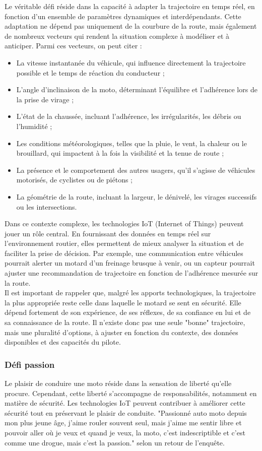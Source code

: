 Le véritable défi réside dans la capacité à adapter la trajectoire en temps réel, en fonction d’un ensemble de paramètres dynamiques et interdépendants. Cette adaptation ne dépend pas uniquement de la courbure de la route, mais également de nombreux vecteurs qui rendent la situation complexe à modéliser et à anticiper. Parmi ces vecteurs, on peut citer :\\
\begin{itemize}
\item La vitesse instantanée du véhicule, qui influence directement la trajectoire possible et le temps de réaction du conducteur ;
\item L’angle d’inclinaison de la moto, déterminant l’équilibre et l’adhérence lors de la prise de virage ;
\item L’état de la chaussée, incluant l’adhérence, les irrégularités, les débris ou l’humidité ;
\item Les conditions météorologiques, telles que la pluie, le vent, la chaleur ou le brouillard, qui impactent à la fois la visibilité et la tenue de route ;
\item La présence et le comportement des autres usagers, qu’il s’agisse de véhicules motorisés, de cyclistes ou de piétons ;
\item La géométrie de la route, incluant la largeur, le dénivelé, les virages successifs ou les intersections.
\end{itemize}
Dans ce contexte complexe, les technologies IoT (Internet of Things) peuvent jouer un rôle central. En fournissant des données en temps réel sur l’environnement routier, elles permettent de mieux analyser la situation et de faciliter la prise de décision. Par exemple, une communication entre véhicules pourrait alerter un motard d’un freinage brusque à venir, ou un capteur pourrait ajuster une recommandation de trajectoire en fonction de l’adhérence mesurée sur la route.\\
Il est important de rappeler que, malgré les apports technologiques, la trajectoire la plus appropriée reste celle dans laquelle le motard se sent en sécurité. Elle dépend fortement de son expérience, de ses réflexes, de sa confiance en lui et de sa connaissance de la route. Il n’existe donc pas une seule "bonne" trajectoire, mais une pluralité d’options, à ajuster en fonction du contexte, des données disponibles et des capacités du pilote.

\subsubsection{Défi passion}
\vspace{0.5cm}
Le plaisir de conduire une moto réside dans la sensation de liberté qu'elle procure. Cependant, cette liberté s'accompagne de responsabilités, notamment en matière de sécurité. Les technologies IoT peuvent contribuer à améliorer cette sécurité tout en préservant le plaisir de conduite. "Passionné auto moto depuis mon plus jeune âge, j'aime rouler souvent seul, mais j'aime me sentir libre et pouvoir aller où je veux et quand je veux, la moto, c'est indescriptible et c'est comme une drogue, mais c'est la passion." selon un retour de l'enquête.

